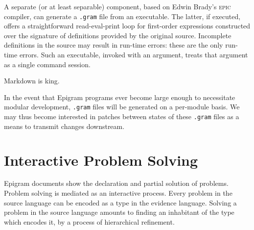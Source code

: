 \documentclass{article}
\begin{document}
A separate (or at least separable) component, based on Edwin Brady's
\textsc{epic} compiler, can generate a \texttt{.gram} file from an
executable. The latter, if executed, offers a straightforward
read-eval-print loop for first-order expressions constructed over the
signature of definitions provided by the original source. Incomplete
definitions in the source may result in run-time errors: these are the
only run-time errors.  Such an executable, invoked with an argument,
treats that argument as a single command session.

Markdown is king.

In the event that Epigram programs ever become large enough to
necessitate modular development, \texttt{.gram} files will be generated
on a per-module basis. We may thus become interested in patches
between states of these \texttt{.gram} files as a means to transmit
changes downstream.


\section{Interactive Problem Solving}

Epigram documents show the declaration and partial solution of problems.
Problem solving is mediated as an interactive process. Every problem
in the source language can be encoded as a type in the evidence
language. Solving a problem in the source language amounts to finding
an inhabitant of the type which encodes it, by a process of
hierarchical refinement.
\end{document}
